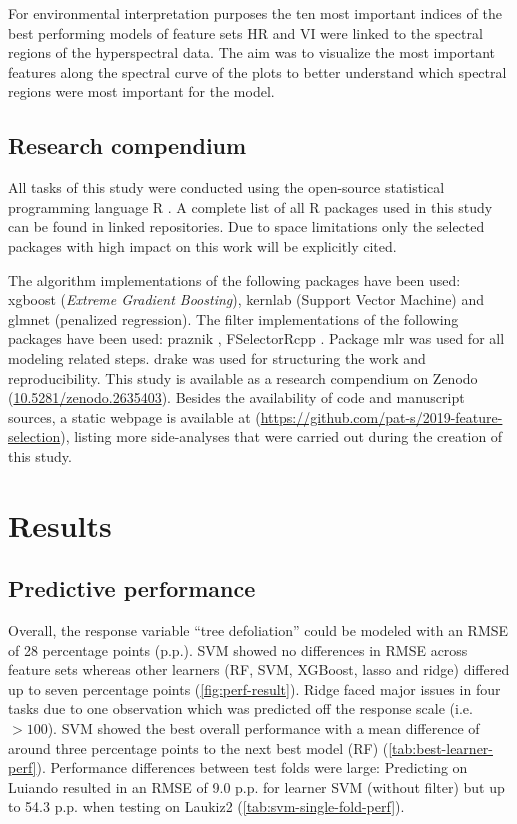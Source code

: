 \documentclass[letterpaper, peerreview, draftcls]{IEEEtran}
\begin{document}
For environmental interpretation purposes the ten most important indices of the best performing models of feature sets HR and VI were linked to the spectral regions of the hyperspectral data.
The aim was to visualize the most important features along the spectral curve of the plots to better understand which spectral regions were most important for the model.

\subsection{Research compendium}

All tasks of this study were conducted using the open-source statistical programming language R \cite{rcoreteam2019}.
A complete list of all R packages used in this study can be found in linked repositories.
Due to space limitations only the selected packages with high impact on this work will be explicitly cited.

The algorithm implementations of the following packages have been used: xgboost \cite{chen2016} (\textit{Extreme Gradient Boosting}), kernlab \cite{kernlab} (Support Vector Machine) and glmnet \cite{glmnet} (penalized regression).
The filter implementations of the following packages have been used: praznik \cite{praznik}, FSelectorRcpp \cite{fselectorrcpp}.
Package mlr \cite{mlr} was used for all modeling related steps.
drake \cite{drake} was used for structuring the work and reproducibility.
This study is available as a research compendium on Zenodo (\url{10.5281/zenodo.2635403}).
Besides the availability of code and manuscript sources, a static webpage is available at (\url{https://github.com/pat-s/2019-feature-selection}), listing more side-analyses that were carried out during the creation of this study.

\section{Results}

\subsection{Predictive performance}

Overall, the response variable \enquote{tree defoliation} could be modeled with an \ac{RMSE} of 28 percentage points (p.p.).
SVM showed no differences in RMSE across feature sets whereas other learners (RF, SVM, XGBoost, lasso and ridge) differed up to seven percentage points (\autoref{fig:perf-result}).
Ridge faced major issues in four tasks due to one observation which was predicted off the response scale (i.e. $> 100$).
SVM showed the best overall performance with a mean difference of around three percentage points to the next best model (RF) (\autoref{tab:best-learner-perf}).
Performance differences between test folds were large: Predicting on Luiando resulted in an RMSE of 9.0 p.p. for learner SVM (without filter) but up to 54.3 p.p. when testing on Laukiz2 (\autoref{tab:svm-single-fold-perf}).
\end{document}
